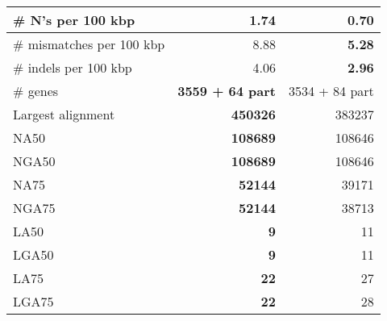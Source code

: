 \documentclass[12pt,a4paper]{article}
\begin{document}
\begin{table}[ht]
\begin{center}
\begin{tabular}{|l*{2}{|r}|}
\# N's per 100 kbp & 1.74 & {\bf 0.70} \\ \hline
\# mismatches per 100 kbp & 8.88 & {\bf 5.28} \\ \hline
\# indels per 100 kbp & 4.06 & {\bf 2.96} \\ \hline
\# genes & {\bf 3559 + 64 part} & 3534 + 84 part \\ \hline
Largest alignment & {\bf 450326} & 383237 \\ \hline
NA50 & {\bf 108689} & 108646 \\ \hline
NGA50 & {\bf 108689} & 108646 \\ \hline
NA75 & {\bf 52144} & 39171 \\ \hline
NGA75 & {\bf 52144} & 38713 \\ \hline
LA50 & {\bf 9} & 11 \\ \hline
LGA50 & {\bf 9} & 11 \\ \hline
LA75 & {\bf 22} & 27 \\ \hline
LGA75 & {\bf 22} & 28 \\ \hline
\end{tabular}
\end{center}
\end{table}
\end{document}

